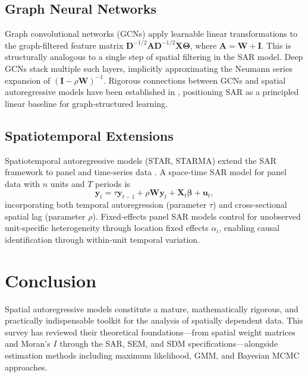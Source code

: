 \documentclass[conference]{IEEEtran}
\theoremstyle{definition}
\begin{document}
\subsection{Graph Neural Networks}

Graph convolutional networks (GCNs) \cite{kipf2017semi} apply learnable linear transformations to the graph-filtered feature matrix $\mathbf{D}^{-1/2}\mathbf{A}\mathbf{D}^{-1/2}\mathbf{X}\mathbf{\Theta}$, where $\mathbf{A} = \mathbf{W} + \mathbf{I}$. This is structurally analogous to a single step of spatial filtering in the SAR model. Deep GCNs stack multiple such layers, implicitly approximating the Neumann series expansion of $(\mathbf{I} - \rho\mathbf{W})^{-1}$. Rigorous connections between GCNs and spatial autoregressive models have been established in \cite{zhu2020beyond}, positioning SAR as a principled linear baseline for graph-structured learning.

\subsection{Spatiotemporal Extensions}

Spatiotemporal autoregressive models (STAR, STARMA) extend the SAR framework to panel and time-series data \cite{anselin2008spatial}. A space-time SAR model for panel data with $n$ units and $T$ periods is
\begin{equation}
\mathbf{y}_t = \tau\mathbf{y}_{t-1} + \rho\mathbf{W}\mathbf{y}_t + \mathbf{X}_t\bm{\beta} + \bm{u}_t,
\end{equation}
incorporating both temporal autoregression (parameter $\tau$) and cross-sectional spatial lag (parameter $\rho$). Fixed-effects panel SAR models \cite{elhorst2010applied} control for unobserved unit-specific heterogeneity through location fixed effects $\alpha_i$, enabling causal identification through within-unit temporal variation.

\section{Conclusion}
\label{sec:conclusion}

Spatial autoregressive models constitute a mature, mathematically rigorous, and practically indispensable toolkit for the analysis of spatially dependent data. This survey has reviewed their theoretical foundations---from spatial weight matrices and Moran's $I$ through the SAR, SEM, and SDM specifications---alongside estimation methods including maximum likelihood, GMM, and Bayesian MCMC approaches.
\end{document}
